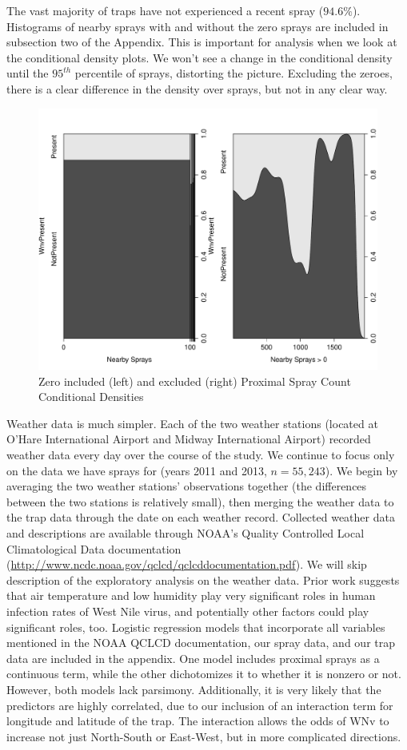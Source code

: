 \documentclass[12pt]{article}
\begin{document}
The vast majority of traps have not experienced a recent spray ($94.6\%$). Histograms of nearby sprays with and without the zero sprays are included in subsection two of the Appendix. This is important for analysis when we look at the conditional density plots. We won't see a change in the conditional density until the $95^{th}$ percentile of sprays, distorting the picture. Excluding the zeroes, there is a clear difference in the density over sprays, but not in any clear way.
\begin{figure}[H] \center
\includegraphics[scale=.35]{CD_NearbySpraysVSwnv.pdf}
\caption*{Zero included (left) and excluded (right) Proximal Spray Count Conditional Densities}
\end{figure}

Weather data is much simpler. Each of the two weather stations (located at O'Hare International Airport and Midway International Airport) recorded weather data every day over the course of the study. We continue to focus only on the data we have sprays for (years 2011 and 2013, $n=55,243$). We begin by averaging the two weather stations' observations together (the differences between the two stations is relatively small), then merging the weather data to the trap data through the date on each weather record. Collected weather data and descriptions are available through NOAA's Quality Controlled Local Climatological Data documentation (\url{http://www.ncdc.noaa.gov/qclcd/qclcddocumentation.pdf}). We will skip description of the exploratory analysis on the weather data. Prior work\cite{ruiz2009local} suggests that air temperature and low humidity play very significant roles in human infection rates of West Nile virus, and potentially other factors could play significant roles, too. Logistic regression models that incorporate all variables mentioned in the NOAA QCLCD documentation, our spray data, and our trap data are included in the appendix. One model includes proximal sprays as a continuous term, while the other dichotomizes it to whether it is nonzero or not. However, both models lack parsimony. Additionally, it is very likely that the predictors are highly correlated, due to our inclusion of an interaction term for longitude and latitude of the trap. The interaction allows the odds of WNv to increase not just North-South or East-West, but in more complicated directions. 
\end{document}
